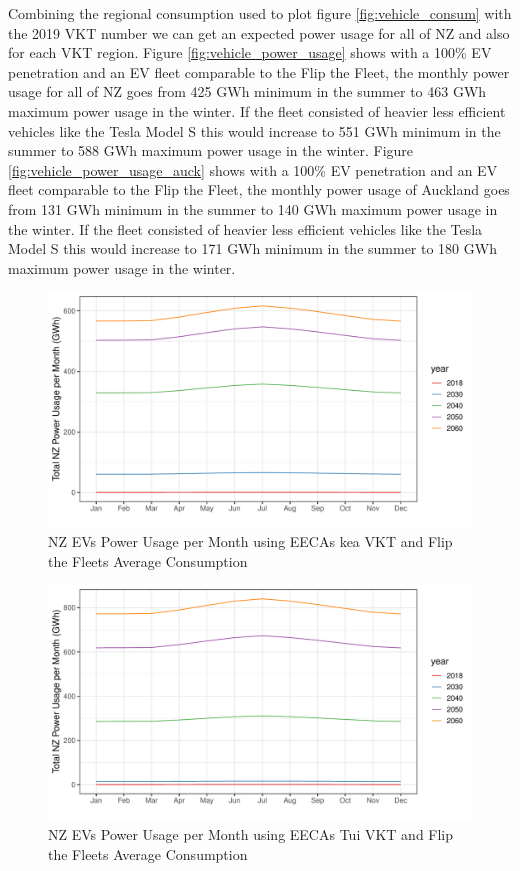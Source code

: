 \documentclass[
]{article}
\begin{document}
Combining the regional consumption used to plot figure
\ref{fig:vehicle_consum} with the 2019 VKT number we can get an expected
power usage for all of NZ and also for each VKT region. Figure
\ref{fig:vehicle_power_usage} shows with a 100\% EV penetration and an
EV fleet comparable to the Flip the Fleet, the monthly power usage for
all of NZ goes from 425 GWh minimum in the summer to 463 GWh maximum
power usage in the winter. If the fleet consisted of heavier less
efficient vehicles like the Tesla Model S this would increase to 551 GWh
minimum in the summer to 588 GWh maximum power usage in the winter.
Figure \ref{fig:vehicle_power_usage_auck} shows with a 100\% EV
penetration and an EV fleet comparable to the Flip the Fleet, the
monthly power usage of Auckland goes from 131 GWh minimum in the summer
to 140 GWh maximum power usage in the winter. If the fleet consisted of
heavier less efficient vehicles like the Tesla Model S this would
increase to 171 GWh minimum in the summer to 180 GWh maximum power usage
in the winter.

\begin{figure}
\centering
\includegraphics{summary_week4_files/figure-latex/kea_power_usage-1.pdf}
\caption{NZ EVs Power Usage per Month using EECAs kea VKT and Flip the
Fleets Average Consumption\label{fig:kea_power_usage}}
\end{figure}

\begin{figure}
\centering
\includegraphics{summary_week4_files/figure-latex/tui_power_usage-1.pdf}
\caption{NZ EVs Power Usage per Month using EECAs Tui VKT and Flip the
Fleets Average Consumption\label{fig:tui_power_usage}}
\end{figure}
\end{document}
